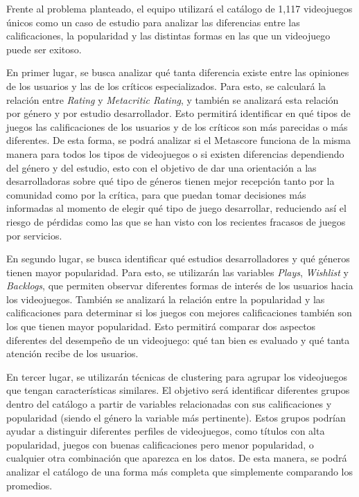 \documentclass[letterpaper,11pt]{article}
\begin{document}
Frente al problema planteado, el equipo utilizará el catálogo de 1{,}117 videojuegos únicos como un caso de estudio para analizar las diferencias entre las calificaciones, la popularidad y las distintas formas en las que un videojuego puede ser exitoso.

En primer lugar, se busca analizar qué tanta diferencia existe entre las opiniones de los usuarios y las de los críticos especializados. Para esto, se calculará la relación entre \textit{Rating} y \textit{Metacritic Rating}, y también se analizará esta relación por género y por estudio desarrollador. Esto permitirá identificar en qué tipos de juegos las calificaciones de los usuarios y de los críticos son más parecidas o más diferentes. De esta forma, se podrá analizar si el Metascore funciona de la misma manera para todos los tipos de videojuegos o si existen diferencias dependiendo del género y del estudio,
esto con el objetivo de dar una orientación a las desarrolladoras sobre qué tipo de géneros tienen mejor recepción tanto por la comunidad como por la crítica, para que puedan tomar decisiones más informadas al momento de elegir qué tipo de juego desarrollar, reduciendo así el riesgo de pérdidas como las que se han visto con los recientes fracasos de juegos por servicios.

En segundo lugar, se busca identificar qué estudios desarrolladores y qué géneros tienen mayor popularidad. Para esto, se utilizarán las variables \textit{Plays}, \textit{Wishlist} y \textit{Backlogs}, que permiten observar diferentes formas de interés de los usuarios hacia los videojuegos. También se analizará la relación entre la popularidad y las calificaciones para determinar si los juegos con mejores calificaciones también son los que tienen mayor popularidad. Esto permitirá comparar dos aspectos diferentes del desempeño de un videojuego: qué tan bien es evaluado y qué tanta atención recibe de los usuarios. 

En tercer lugar, se utilizarán técnicas de clustering para agrupar los videojuegos que tengan características similares. El objetivo será identificar diferentes grupos dentro del catálogo a partir de variables relacionadas con sus calificaciones y popularidad (siendo el género la variable más pertinente). Estos grupos podrían ayudar a distinguir diferentes perfiles de videojuegos, como títulos con alta popularidad, juegos con buenas calificaciones pero menor popularidad, o cualquier otra combinación que aparezca en los datos. De esta manera, se podrá analizar el catálogo de una forma más completa que simplemente comparando los promedios.
\end{document}
